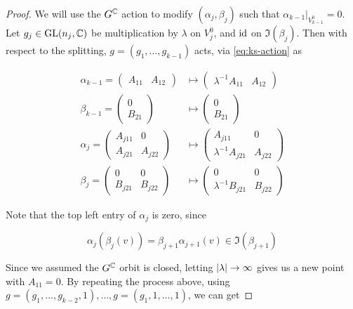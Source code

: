 \documentclass{report}
\begin{document}
\begin{proof}
    We will use the \(G^{\mathbb{C}}\) action to modify \((\alpha_j, \beta_j)\) such that \(\alpha_{k-1}\vert_{V_{k-1}^0} = 0\). Let \(g_j \in \operatorname{GL}(n_j, \mathbb{C})\) be multiplication by \(\lambda\) on \(V_j^0\), and \(\operatorname{id}\) on \(\Im(\beta_j)\). Then with respect to the splitting, \(g = (g_1, \dots, g_{k-1})\) acts, via \cref{eq:ks-action} as

    \begin{align*}
        \alpha_{k-1} = \begin{pmatrix}
            A_{11} & A_{12}
        \end{pmatrix} &\mapsto \begin{pmatrix}
            \lambda^{-1}A_{11} & A_{12}
        \end{pmatrix} \\
        \beta_{k-1} = \begin{pmatrix}
            0 \\ B_{21}
        \end{pmatrix} &\mapsto \begin{pmatrix}
            0 \\ B_{21}
        \end{pmatrix} \\
        \alpha_j = \begin{pmatrix}
            A_{j11} & 0 \\
            A_{j21} & A_{j22}
        \end{pmatrix} &\mapsto \begin{pmatrix}
            A_{j11} & 0 \\
            \lambda^{-1}A_{j21} & A_{j22}
        \end{pmatrix} \\
        \beta_j = \begin{pmatrix}
            0 & 0 \\
            B_{j21} & B_{j22}
        \end{pmatrix} &\mapsto \begin{pmatrix}
            0 & 0 \\
            \lambda^{-1}B_{j21} & B_{j22}
        \end{pmatrix}
    \end{align*}

    Note that the top left entry of \(\alpha_j\) is zero, since

    \[\alpha_j(\beta_j(v)) = \beta_{j+1}\alpha_{j+1}(v) \in \Im(\beta_{j+1})\]

    Since we assumed the \(G^{\mathbb{C}}\) orbit is closed, letting \(\abs{\lambda} \to \infty\) gives us a new point with \(A_{11} = 0\). By repeating the process above, using \(g = (g_1, \dots, g_{k-2}, 1), \dots, g = (g_1, 1, \dots, 1)\), we can get


\end{proof}
\end{document}
